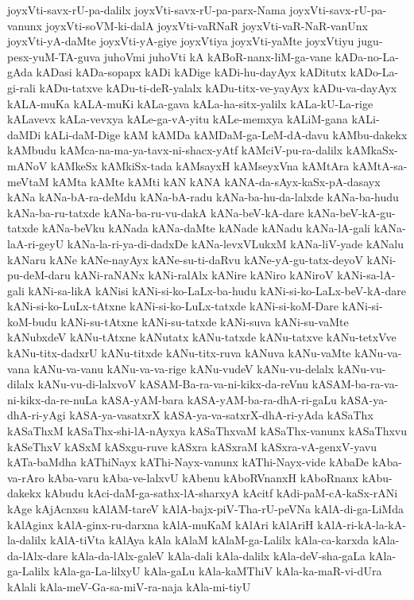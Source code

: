 {joyxVti-savx-rU-pa-dalilx
joyxVti-savx-rU-pa-parx-Nama
joyxVti-savx-rU-pa-vanunx
joyxVti-soVM-ki-dalA
joyxVti-vaRNaR
joyxVti-vaR-NaR-vanUnx
joyxVti-yA-daMte
joyxVti-yA-giye
joyxVtiya
joyxVti-yaMte
joyxVtiyu
jugu-pesx-yuM-TA-guva
juhoVmi
juhoVti
kA
kABoR-nanx-liM-ga-vane
kADa-no-La-gAda
kADasi
kADa-sopapx
kADi
kADige
kADi-hu-dayAyx
kADitutx
kADo-La-gi-rali
kADu-tatxve
kADu-ti-deR-yalalx
kADu-titx-ve-yayAyx
kADu-va-dayAyx
kALA-muKa
kALA-muKi
kALa-gava
kALa-ha-sitx-yalilx
kALa-kU-La-rige
kALavevx
kALa-vevxya
kALe-ga-vA-yitu
kALe-memxya
kALiM-gana
kALi-daMDi
kALi-daM-Dige
kAM
kAMDa
kAMDaM-ga-LeM-dA-davu
kAMbu-dakekx
kAMbudu
kAMca-na-ma-ya-tavx-ni-shacx-yAtf
kAMciV-pu-ra-dalilx
kAMkaSx-mANoV
kAMkeSx
kAMkiSx-tada
kAMsayxH
kAMseyxVna
kAMtAra
kAMtA-sa-meVtaM
kAMta
kAMte
kAMti
kAN
kANA
kANA-da-sAyx-kaSx-pA-dasayx
kANa
kANa-bA-ra-deMdu
kANa-bA-radu
kANa-ba-hu-da-lalxde
kANa-ba-hudu
kANa-ba-ru-tatxde
kANa-ba-ru-vu-dakA
kANa-beV-kA-dare
kANa-beV-kA-gu-tatxde
kANa-beVku
kANada
kANa-daMte
kANade
kANadu
kANa-lA-gali
kANa-laA-ri-geyU
kANa-la-ri-ya-di-dadxDe
kANa-levxVLukxM
kANa-liV-yade
kANalu
kANaru
kANe
kANe-nayAyx
kANe-su-ti-daRvu
kANe-yA-gu-tatx-deyoV
kANi-pu-deM-daru
kANi-raNANx
kANi-ralAlx
kANire
kANiro
kANiroV
kANi-sa-lA-gali
kANi-sa-likA
kANisi
kANi-si-ko-LaLx-ba-hudu
kANi-si-ko-LaLx-beV-kA-dare
kANi-si-ko-LuLx-tAtxne
kANi-si-ko-LuLx-tatxde
kANi-si-koM-Dare
kANi-si-koM-budu
kANi-su-tAtxne
kANi-su-tatxde
kANi-suva
kANi-su-vaMte
kANubxdeV
kANu-tAtxne
kANutatx
kANu-tatxde
kANu-tatxve
kANu-tetxVve
kANu-titx-dadxrU
kANu-titxde
kANu-titx-ruva
kANuva
kANu-vaMte
kANu-va-vana
kANu-va-vanu
kANu-va-va-rige
kANu-vudeV
kANu-vu-delalx
kANu-vu-dilalx
kANu-vu-di-lalxvoV
kASAM-Ba-ra-va-ni-kikx-da-reVnu
kASAM-ba-ra-va-ni-kikx-da-re-nuLa
kASA-yAM-bara
kASA-yAM-ba-ra-dhA-ri-gaLu
kASA-ya-dhA-ri-yAgi
kASA-ya-vasatxrX
kASA-ya-va-satxrX-dhA-ri-yAda
kASaThx
kASaThxM
kASaThx-shi-lA-nAyxya
kASaThxvaM
kASaThx-vanunx
kASaThxvu
kASeThxV
kASxM
kASxgu-ruve
kASxra
kASxraM
kASxra-vA-genxV-yavu
kATa-baMdha
kAThiNayx
kAThi-Nayx-vanunx
kAThi-Nayx-vide
kAbaDe
kAba-va-rAro
kAba-varu
kAba-ve-lalxvU
kAbenu
kAboRVnanxH
kAboRnanx
kAbu-dakekx
kAbudu
kAci-daM-ga-sathx-lA-sharxyA
kAcitf
kAdi-paM-cA-kaSx-rANi
kAge
kAjAcnxsu
kAlAM-tareV
kAlA-bajx-piV-Tha-rU-peVNa
kAlA-di-ga-LiMda
kAlAginx
kAlA-ginx-ru-darxna
kAlA-muKaM
kAlAri
kAlAriH
kAlA-ri-kA-la-kA-la-dalilx
kAlA-tiVta
kAlAya
kAla
kAlaM
kAlaM-ga-Lalilx
kAla-ca-karxda
kAla-da-lAlx-dare
kAla-da-lAlx-galeV
kAla-dali
kAla-dalilx
kAla-deV-sha-gaLa
kAla-ga-Lalilx
kAla-ga-La-lilxyU
kAla-gaLu
kAla-kaMThiV
kAla-ka-maR-vi-dUra
kAlali
kAla-meV-Ga-sa-miV-ra-naja
kAla-mi-tiyU
}
